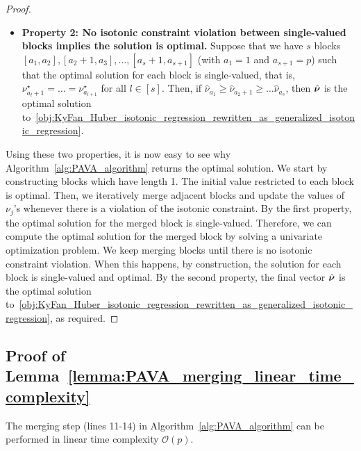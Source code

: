 \begin{proof}
\begin{itemize}[label=$\diamond$,leftmargin=*]
        \item \textbf{Property 2: No isotonic constraint violation between single-valued blocks implies the solution is optimal.} Suppose that we have $s$ blocks $[a_1, a_2], [a_2+1, a_3], \ldots, [a_{s}+1, a_{s+1}]$ (with $a_1=1$ and $a_{s+1}=p$) such that the optimal solution for each block is single-valued, that is, $\nu^\star_{a_l+1} = \dots = \nu^\star_{a_{l+1}}$ for all $l \in [s]$. Then, if $\hat{\nu}_{a_1} \geq \hat{\nu}_{a_2+1} \geq \ldots \hat{\nu}_{a_{s}}$, then $\hat{\bm{\nu}}$ is the optimal solution to~\eqref{obj:KyFan_Huber_isotonic_regression_rewritten_as_generalized_isotonic_regression}.
    \end{itemize}
    
    Using these two properties, it is now easy to see why Algorithm~\ref{alg:PAVA_algorithm} returns the optimal solution. 
    We start by constructing blocks which have length 1.
    The initial value restricted to each block is optimal.
    Then, we iteratively merge adjacent blocks and update the values of $\nu_j$'s whenever there is a violation of the isotonic constraint.
    By the first property, the optimal solution for the merged block is single-valued.
    Therefore, we can compute the optimal solution for the merged block by solving a univariate optimization problem.
    We keep merging blocks until there is no isotonic constraint violation.
    When this happens, by construction, the solution for each block is single-valued and optimal.
    By the second property, the final vector $\hat{\bm{\nu}}$ is the optimal solution to~\eqref{obj:KyFan_Huber_isotonic_regression_rewritten_as_generalized_isotonic_regression}, as required.
\end{proof}

\subsection{Proof of Lemma~\ref{lemma:PAVA_merging_linear_time_complexity}}

\begin{namedlemma}
    [~\ref{lemma:PAVA_merging_linear_time_complexity}]
    The merging step (lines 11-14) in Algorithm~\ref{alg:PAVA_algorithm} can be performed in linear time complexity $\mathcal O(p)$.
\end{namedlemma}

